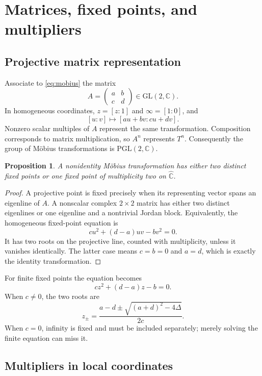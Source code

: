 \documentclass[11pt,a4paper]{article}
\newcommand{\C}{\mathbb{C}}
\newcommand{\Chat}{\widehat{\mathbb{C}}}
\theoremstyle{plain}
\newtheorem{proposition}[theorem]{Proposition}
\theoremstyle{definition}
\theoremstyle{remark}
\begin{document}
\section{Matrices, fixed points, and multipliers}

\subsection{Projective matrix representation}

Associate to \eqref{eq:mobius} the matrix
\[
  A=\begin{pmatrix}a&b\\c&d\end{pmatrix}\in\mathrm{GL}(2,\C).
\]
In homogeneous coordinates, $z=[z:1]$ and $\infty=[1:0]$, and
\[
  [u:v]\longmapsto[au+bv:cu+dv].
\]
Nonzero scalar multiples of $A$ represent the same transformation.
Composition corresponds to matrix multiplication, so $A^n$ represents $T^n$.
Consequently the group of M\"obius transformations is
$\mathrm{PGL}(2,\C)$.

\begin{proposition}\label{prop:fixed}
A nonidentity M\"obius transformation has either two distinct fixed points
or one fixed point of multiplicity two on $\Chat$.
\end{proposition}

\begin{proof}
A projective point is fixed precisely when its representing vector spans
an eigenline of $A$. A nonscalar complex $2\times2$ matrix has either two
distinct eigenlines or one eigenline and a nontrivial Jordan block.
Equivalently, the homogeneous fixed-point equation is
\[
  cu^2+(d-a)uv-bv^2=0.
\]
It has two roots on the projective line, counted with multiplicity, unless
it vanishes identically. The latter case means $c=b=0$ and $a=d$, which
is exactly the identity transformation.
\end{proof}

For finite fixed points the equation becomes
\begin{equation}\label{eq:fixed}
  cz^2+(d-a)z-b=0.
\end{equation}
When $c\ne0$, the two roots are
\[
  z_{\pm}=\frac{a-d\pm\sqrt{(a+d)^2-4\Delta}}{2c}.
\]
When $c=0$, infinity is fixed and must be included separately; merely
solving the finite equation can miss it.

\subsection{Multipliers in local coordinates}
\end{document}
